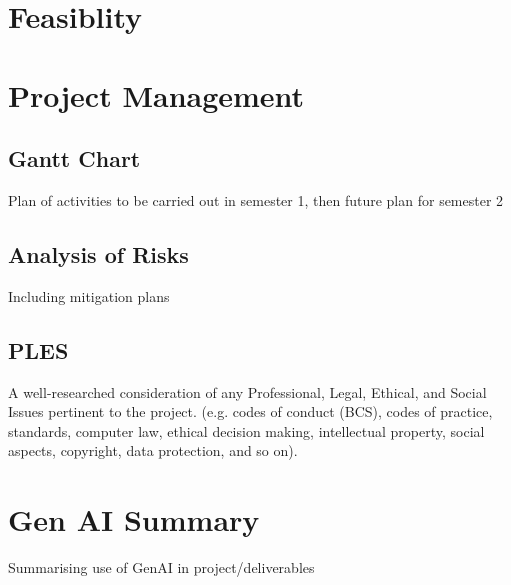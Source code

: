 \documentclass[12pt,nonacm,acmlarge,titlepage,screen]{acmart}
\begin{document}
\section{Feasiblity} \label{sec:feasiblity}






\newpage
\appendix


\section{Project Management}

\subsection{Gantt Chart}
Plan of activities to be carried out in semester 1, then future plan for semester 2

\subsection{Analysis of Risks}
Including mitigation plans

\subsection{PLES}
A well-researched consideration of any Professional, Legal, Ethical, and Social Issues
pertinent to the project. (e.g. codes of conduct (BCS), codes of practice, standards,
computer law, ethical decision making, intellectual property, social aspects, copyright,
data protection, and so on).

\section{Gen AI Summary}
Summarising use of GenAI in project/deliverables

\end{document}
